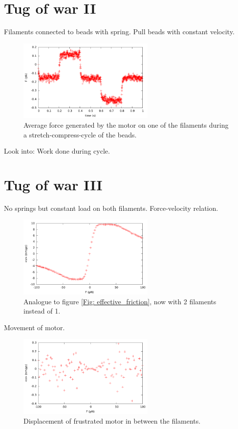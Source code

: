 \documentclass[aps,pre,onecolumn,showpacs,showkeys,a4paper]{revtex4}
\begin{document}
\section{Tug of war II}

Filaments connected to beads with spring. Pull beads with constant velocity.
\begin{figure}[h]
\centering
\includegraphics[width=0.6\textwidth,height=!]{tug_v}
\caption{Average force generated by the motor on one of the filaments during a stretch-compress-cycle of the beads.}
\label{Fig: tug_v}
\end{figure}
Look into: Work done during cycle.
\section{Tug of war III}

No springs but constant load on both filaments.\newline
Force-velocity relation.\newline
\begin{figure}[h]
\centering
\includegraphics[width=0.6\textwidth,height=!]{tug_F}
\caption{Analogue to figure \ref{Fig: effective_friction}, now with 2 filaments instead of 1.}
\label{Fig: tug_F}
\end{figure}
Movement of motor.
\begin{figure}[h]
\centering
\includegraphics[width=0.6\textwidth,height=!]{tug_F_motor}
\caption{Displacement of frustrated motor in between the filaments.}
\label{Fig: tug_F_motor}
\end{figure}
\end{document}
